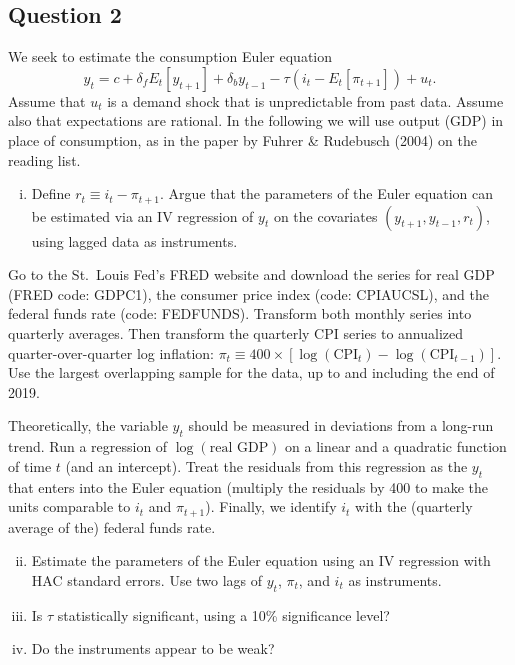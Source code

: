 \documentclass[12pt]{article}
\theoremstyle{plain}
\begin{document}
\subsection*{Question 2}
We seek to estimate the consumption Euler equation
\[y_t = c + \delta_f E_t[y_{t+1}] + \delta_b y_{t-1} - \tau(i_t - E_t[\pi_{t+1}]) + u_t.\]
Assume that $u_t$ is a demand shock that is unpredictable from past data. Assume also that expectations are rational. In the following we will use output (GDP) in place of consumption, as in the paper by Fuhrer \& Rudebusch (2004) on the reading list.

\begin{enumerate}[i)]
\item Define $r_t \equiv i_t-\pi_{t+1}$. Argue that the parameters of the Euler equation can be estimated via an IV regression of $y_t$ on the covariates $(y_{t+1}, y_{t-1}, r_t)$, using lagged data as instruments.
\end{enumerate}
Go to the St.\ Louis Fed's FRED website and download the series for real GDP (FRED code: GDPC1), the consumer price index (code: CPIAUCSL), and the federal funds rate (code: FEDFUNDS). Transform both monthly series into quarterly averages. Then transform the quarterly CPI series to annualized quarter-over-quarter log inflation: $\pi_t \equiv 400 \times [\log(\text{CPI}_t)-\log(\text{CPI}_{t-1})]$. Use the largest overlapping sample for the data, up to and including the end of 2019.

Theoretically, the variable $y_t$ should be measured in deviations from a long-run trend. Run a regression of $\log(\text{real GDP})$ on a linear and a quadratic function of time $t$ (and an intercept). Treat the residuals from this regression as the $y_t$ that enters into the Euler equation (multiply the residuals by 400 to make the units comparable to $i_t$ and $\pi_{t+1}$). Finally, we identify $i_t$ with the (quarterly average of the) federal funds rate.
\begin{enumerate}[i)]
\setcounter{enumi}{1}
\item Estimate the parameters of the Euler equation using an IV regression with HAC standard errors. Use two lags of $y_t$, $\pi_t$, and $i_t$ as instruments.
\item Is $\tau$ statistically significant, using a 10\% significance level?
\item Do the instruments appear to be weak?
\end{enumerate}

\clearpage
\end{document}
